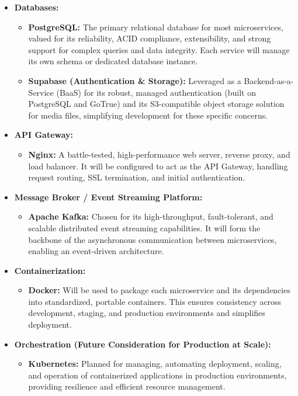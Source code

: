 \documentclass[12pt, a4paper]{report} %
\begin{document}
\begin{itemize}
\begin{itemize}
\begin{itemize}
        \end{itemize}
    \item \textbf{Databases:}
        \begin{itemize}
            \item \textbf{PostgreSQL:} The primary relational database for most microservices, valued for its reliability, ACID compliance, extensibility, and strong support for complex queries and data integrity. Each service will manage its own schema or dedicated database instance.
            \item \textbf{Supabase (Authentication \& Storage):} Leveraged as a Backend-as-a-Service (BaaS) for its robust, managed authentication (built on PostgreSQL and GoTrue) and its S3-compatible object storage solution for media files, simplifying development for these specific concerns.
        \end{itemize}
    \item \textbf{API Gateway:}
        \begin{itemize}
            \item \textbf{Nginx:} A battle-tested, high-performance web server, reverse proxy, and load balancer. It will be configured to act as the API Gateway, handling request routing, SSL termination, and initial authentication.
        \end{itemize}
    \item \textbf{Message Broker / Event Streaming Platform:}
        \begin{itemize}
            \item \textbf{Apache Kafka:} Chosen for its high-throughput, fault-tolerant, and scalable distributed event streaming capabilities. It will form the backbone of the asynchronous communication between microservices, enabling an event-driven architecture.
        \end{itemize}
    \item \textbf{Containerization:}
        \begin{itemize}
            \item \textbf{Docker:} Will be used to package each microservice and its dependencies into standardized, portable containers. This ensures consistency across development, staging, and production environments and simplifies deployment.
        \end{itemize}
    \item \textbf{Orchestration (Future Consideration for Production at Scale):}
        \begin{itemize}
            \item \textbf{Kubernetes:} Planned for managing, automating deployment, scaling, and operation of containerized applications in production environments, providing resilience and efficient resource management.
        \end{itemize}
  \end{itemize}


\end{itemize}
\end{document}
